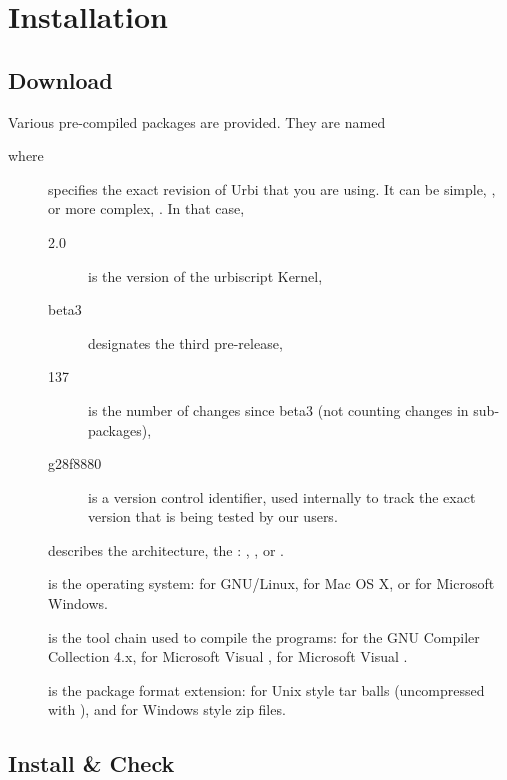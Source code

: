 \chapter{Installation}
\label{sec:installation}

\section{Download}

Various pre-compiled packages are provided.  They are named
\begin{center}
\end{center}
where
\begin{description}
\item[] specifies the exact revision of Urbi that you are
  using.  It can be simple, , or more complex,
  .  In that case,
  \begin{description}
  \item[2.0] is the version of the urbiscript Kernel,
  \item[beta3] designates the third pre-release,
  \item[137] is the number of changes since beta3 (not counting
    changes in sub-packages),
  \item[g28f8880] is a version control identifier, used internally to
    track the exact version that is being tested by our users.
  \end{description}
\item[] describes the architecture, the :
  , , or .
\item[] is the operating system:  for GNU/Linux,
   for Mac OS X, or  for Microsoft Windows.
\item[] is the tool chain used to compile the programs:
   for the GNU Compiler Collection 4.x,  for
  Microsoft Visual ,  for Microsoft Visual
  .
\item[] is the package format extension:  for
  Unix style tar balls (uncompressed with ), and  for Windows style zip files.
\end{description}

\section{Install \&{} Check}

